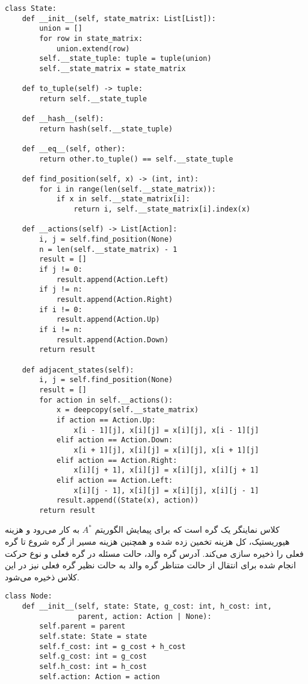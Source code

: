 \documentclass{article}
\newcommand{\code}[1]{\lr{\lstinline|#1|}}
\begin{document}
\begin{latin}
\begin{lstlisting}
class State:
	def __init__(self, state_matrix: List[List]):
		union = []
		for row in state_matrix:
			union.extend(row)
		self.__state_tuple: tuple = tuple(union)
		self.__state_matrix = state_matrix
	
	def to_tuple(self) -> tuple:
		return self.__state_tuple
	
	def __hash__(self):
		return hash(self.__state_tuple)
	
	def __eq__(self, other):
		return other.to_tuple() == self.__state_tuple
	
	def find_position(self, x) -> (int, int):
		for i in range(len(self.__state_matrix)):
			if x in self.__state_matrix[i]:
				return i, self.__state_matrix[i].index(x)
	
	def __actions(self) -> List[Action]:
		i, j = self.find_position(None)
		n = len(self.__state_matrix) - 1
		result = []
		if j != 0:
			result.append(Action.Left)
		if j != n:
			result.append(Action.Right)
		if i != 0:
			result.append(Action.Up)
		if i != n:
			result.append(Action.Down)
		return result
	
	def adjacent_states(self):
		i, j = self.find_position(None)
		result = []
		for action in self.__actions():
			x = deepcopy(self.__state_matrix)
			if action == Action.Up:
				x[i - 1][j], x[i][j] = x[i][j], x[i - 1][j]
			elif action == Action.Down:
				x[i + 1][j], x[i][j] = x[i][j], x[i + 1][j]
			elif action == Action.Right:
				x[i][j + 1], x[i][j] = x[i][j], x[i][j + 1]
			elif action == Action.Left:
				x[i][j - 1], x[i][j] = x[i][j], x[i][j - 1]
			result.append((State(x), action))
		return result
\end{lstlisting}
\end{latin}

 کلاس 
\code{Node}
نماینگر یک گره است که برای پیمایش الگوریتم
$A^*$
 به کار می‌رود و هزینه هیوریستیک، کل هزینه تخمین زده شده و همچنین هزینه مسیر از گره شروع تا گره فعلی را ذخیره سازی می‌کند. آدرس گره والد، حالت مسئله در گره فعلی و نوع حرکت انجام شده برای انتقال از حالت متناظر گره والد به حالت نظیر گره فعلی نیز در این کلاس ذخیره می‌شود.
\begin{latin}
\begin{lstlisting}
class Node:
	def __init__(self, state: State, g_cost: int, h_cost: int, 
				 parent, action: Action | None):
		self.parent = parent
		self.state: State = state
		self.f_cost: int = g_cost + h_cost
		self.g_cost: int = g_cost
		self.h_cost: int = h_cost
		self.action: Action = action
\end{lstlisting}
\end{latin}
 
\end{document}
